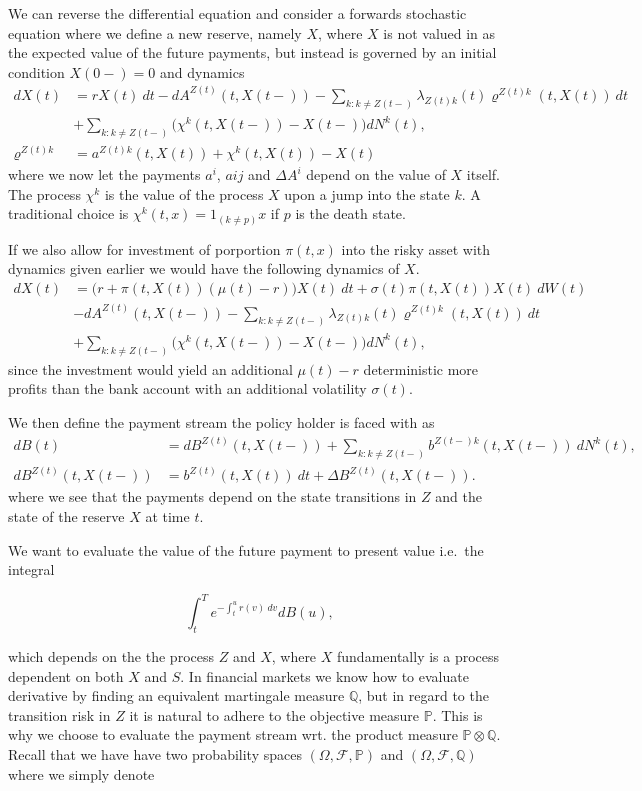 \documentclass[a4paper,12pt,openany]{book}
\begin{document}
We can reverse the differential equation and consider a forwards stochastic equation where we define a new reserve, namely \(X\), where \(X\) is not valued in as the expected value of the future payments, but instead is governed by an initial condition \(X(0-)=0\) and dynamics
\begin{align*}
dX(t)&=rX(t)\ dt-dA^{Z(t)}(t,X(t-))-\sum_{k:k\ne Z(t-)}\lambda_{Z(t)k}(t) \varrho^{Z(t)k}(t,X(t))\ dt\\
&+\sum_{k:k\ne Z(t-)}\Big(\chi^k(t,X(t-))-X(t-)\Big)dN^k(t),\\
\varrho^{Z(t)k}&=a^{Z(t)k}(t,X(t))+\chi^k(t,X(t))-X(t)
\end{align*}
where we now let the payments \(a^i\), \(a{ij}\) and \(\Delta A^i\) depend on the value of \(X\) itself. The process \(\chi^k\) is the value of the process \(X\) upon a jump into the state \(k\). A traditional choice is \(\chi^k(t,x)=1_{(k\ne p)}x\) if \(p\) is the death state.

If we also allow for investment of porportion \(\pi(t,x)\) into the risky asset with dynamics given earlier we would have the following dynamics of \(X\).
\begin{align*}
dX(t)&=\Big(r+\pi(t,X(t))(\mu(t)-r)\Big)X(t)\ dt+\sigma(t)\pi(t,X(t))X(t)\ dW(t)\\
&-dA^{Z(t)}(t,X(t-))-\sum_{k:k\ne Z(t-)}\lambda_{Z(t)k}(t) \varrho^{Z(t)k}(t,X(t))\ dt\\
&+\sum_{k:k\ne Z(t-)}\Big(\chi^k(t,X(t-))-X(t-)\Big)dN^k(t),
\end{align*}
since the investment would yield an additional \(\mu(t)-r\) deterministic more profits than the bank account with an additional volatility \(\sigma(t)\).

We then define the payment stream the policy holder is faced with as
\begin{align*}
dB(t)&=dB^{Z(t)}(t,X(t-))+\sum_{k:k\ne Z(t-)}b^{Z(t-)k}(t,X(t-))\ dN^k(t),\\
dB^{Z(t)}(t,X(t-))&=b^{Z(t)}(t,X(t))\ dt + \Delta B^{Z(t)}(t,X(t-)).
\end{align*}
where we see that the payments depend on the state transitions in \(Z\) and the state of the reserve \(X\) at time \(t\).

We want to evaluate the value of the future payment to present value i.e.~the integral

\[
\int_t^Te^{-\int_t^u r(v)\ dv}dB(u),
\]

which depends on the the process \(Z\) and \(X\), where \(X\) fundamentally is a process dependent on both \(X\) and \(S\). In financial markets we know how to evaluate derivative by finding an equivalent martingale measure \(\mathbb Q\), but in regard to the transition risk in \(Z\) it is natural to adhere to the objective measure \(\mathbb P\). This is why we choose to evaluate the payment stream wrt. the product measure \(\mathbb P\otimes \mathbb Q\). Recall that we have have two probability spaces \((\Omega, \mathcal F,\mathbb P)\) and \((\Omega, \mathcal F,\mathbb Q)\) where we simply denote
\end{document}
